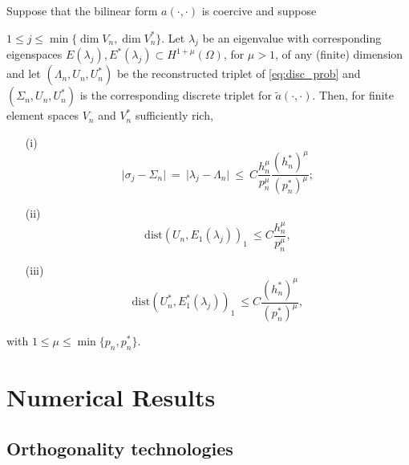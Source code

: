 \documentclass[smallextended]{svjour3}
\begin{document}
\begin{theorem}
\label{th:adj_rec_2}
Suppose  that the bilinear form $a(\cdot,\cdot)$ is coercive and suppose

$ 1 \leq j\leq \min\{\dim V_n,\dim V_n^*\}$. 
Let
$\lambda_j$ be an eigenvalue with
corresponding eigenspaces $E(\lambda_j),E^*(\lambda_j)\subset H^{1+\mu}(\Omega)$, for $\mu>1$, of any (finite) dimension  and
let $(\Lambda_n,U_n,U_n^*)$ be the reconstructed triplet  of \eqref{eq:disc_prob} and $(\Sigma_n,U_n,U_n^*)$ is the corresponding discrete triplet for $\tilde a(\cdot,\cdot)$.
Then, for finite element spaces $V_n$ and $V_n^*$ sufficiently rich,


\begin{itemize}
\item[(i)] 
\begin{equation}\label{eq:supereig_rec_2}
\vert \sigma_j - \Sigma_n \vert \ = \ \vert \lambda_j - \Lambda_n \vert \ \leq \ C
\frac{h_n^{\mu} }{p_n^{\mu}}\frac{(h_n^*)^{\mu} }{(p_n^*)^{\mu}};  
\end{equation}
\item[(ii)] 
\begin{equation}
\label{eq:energy_rec_2} \mathrm{dist}(
U_n,E_1(\lambda_j))_{1} \ \leq
C \frac{h_n^{\mu}}{p_n^{\mu}}, 
\end{equation}
\item[(iii)]
\begin{equation}
\label{eq:energy_dual_rec_2} \mathrm{dist}(
U_n^*,E_1^*(\lambda_j))_{1} \ \leq
C \frac{(h_n^*)^{\mu}}{(p_n^*)^{\mu}}, 
\end{equation}
\end{itemize}
with $1\leq \mu\leq \min\{p_n,p_n^*\}$.
\end{theorem}



\section{Numerical Results} \label{sec:numer}

\subsection{Orthogonality technologies}\label{ssec:ortho}
\end{document}
